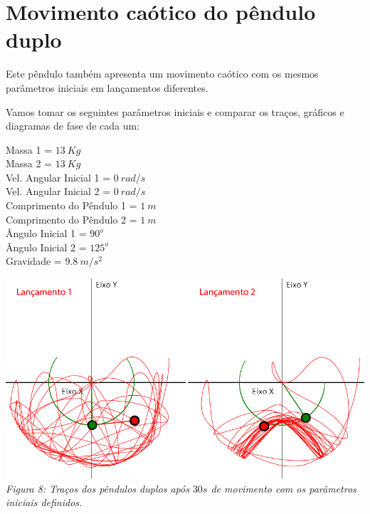 \documentclass[13pt,a4paper]{report}
\begin{document}
\section{Movimento caótico do pêndulo duplo}
Este pêndulo também apresenta um movimento caótico com os mesmos parâmetros iniciais em lançamentos diferentes.

Vamos tomar os seguintes parâmetros iniciais e comparar os traços, gráficos e diagramas de fase de cada um:
\begin{center}
Massa 1 = $ 13 \ Kg $
\\[1mm]Massa 2 = $ 13 \ Kg $
\\[1mm]Vel. Angular Inicial 1 = $ 0 \ rad/s $
\\[1mm]Vel. Angular Inicial 2 = $ 0 \ rad/s $
\\[1mm]Comprimento do Pêndulo 1 = $ 1 \ m $
\\[1mm]Comprimento do Pêndulo 2 = $ 1 \ m $
\\[1mm]Ângulo Inicial 1 = $ 90^{o} $
\\[1mm]Ângulo Inicial 2 = $ 125^{o} $
\\[1mm]Gravidade = $ 9.8 \ m/s^{2} $
\end{center}

\begin{center}
\includegraphics[scale=0.5]{figuras/figura8.png}
\\
\textit{Figura 8: Traços dos pêndulos duplos após $30 s$ de movimento com os parâmetros iniciais definidos.}
\end{center}
\clearpage
\end{document}
